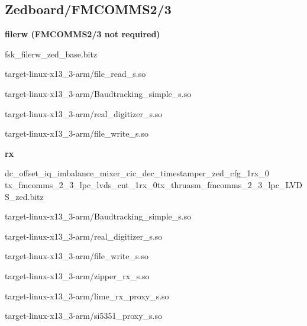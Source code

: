 \pagebreak
\subsection{Zedboard/FMCOMMS2/3}
	\noindent\textbf{filerw (FMCOMMS2/3 not required)}
	\begin{itemize}
	\begin{minipage}[t]{.5\textwidth}
	\item fsk\_filerw\_zed\_base.bitz
	\item target-linux-x13\_3-arm/file\_read\_s.so
	\item target-linux-x13\_3-arm/Baudtracking\_simple\_s.so
	\end{minipage}
	\begin{minipage}[t]{.5\textwidth}
	\item target-linux-x13\_3-arm/real\_digitizer\_s.so
	\item target-linux-x13\_3-arm/file\_write\_s.so
	\end{minipage}
	\end{itemize}

	\noindent\textbf{rx}
	\begin{itemize}
  \item dc\_offset\_iq\_imbalance\_mixer\_cic\_dec\_timestamper\_zed\_cfg\_1rx\_0\\
tx\_fmcomms\_2\_3\_lpc\_lvds\_cnt\_1rx\_0tx\_thruasm\_fmcomms\_2\_3\_lpc\_LVDS\_zed.bitz \\
	\begin{minipage}[t]{.5\textwidth}
	\item target-linux-x13\_3-arm/Baudtracking\_simple\_s.so
	\item target-linux-x13\_3-arm/real\_digitizer\_s.so
	\item target-linux-x13\_3-arm/file\_write\_s.so
	\end{minipage}
	\begin{minipage}[t]{.5\textwidth}
	\item target-linux-x13\_3-arm/zipper\_rx\_s.so
	\item target-linux-x13\_3-arm/lime\_rx\_proxy\_s.so
	\item target-linux-x13\_3-arm/si5351\_proxy\_s.so
	\end{minipage}
	\end{itemize}

